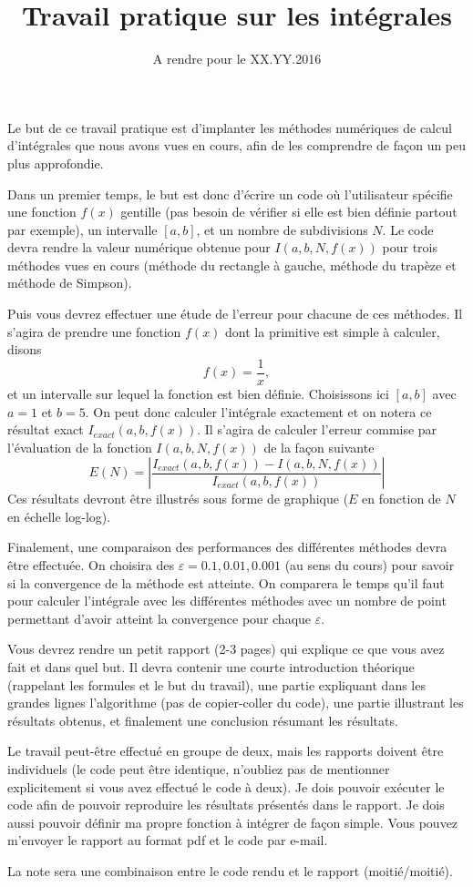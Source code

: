 \documentclass[a4paper,10pt]{article}
\title{Travail pratique sur les intégrales}
\date{A rendre pour le XX.YY.2016}
\begin{document}
\maketitle

Le but de ce travail pratique est d'implanter les méthodes numériques de calcul d'intégrales que nous avons vues en cours,
afin de les comprendre de façon un peu plus approfondie.

Dans un premier temps, le but est donc d'écrire un code où l'utilisateur spécifie une fonction $f(x)$ gentille (pas besoin de vérifier 
si elle est bien définie partout par exemple), un intervalle $[a,b]$, et 
un nombre de subdivisions $N$. Le code devra rendre la valeur numérique obtenue pour $I(a,b,N,f(x))$ pour trois méthodes 
vues en cours (méthode du rectangle à gauche, méthode du trapèze et méthode de Simpson).

Puis vous devrez effectuer une étude de l'erreur pour chacune de ces méthodes. Il s'agira de prendre une fonction $f(x)$ 
dont la primitive est simple à calculer, disons
\begin{equation}
f(x)=\frac{1}{x},
\end{equation}
et un intervalle sur lequel la fonction est bien définie. Choisissons ici $[a,b]$ avec $a=1$ et $b=5$. 
On peut donc calculer l'intégrale exactement et on notera ce résultat exact $I_{exact}(a,b,f(x))$.
Il s'agira de calculer l'erreur commise par l'évaluation de la fonction $I(a,b,N,f(x))$ de la façon suivante
\begin{equation}
 E(N)=\left|\frac{I_{exact}(a,b,f(x))-I(a,b,N,f(x))}{I_{exact}(a,b,f(x))}\right|
\end{equation}
Ces résultats devront être illustrés sous forme de graphique ($E$ en fonction de $N$ en échelle log-log).

Finalement, une comparaison des performances des différentes méthodes devra être effectuée.
On choisira des $\varepsilon=0.1,0.01,0.001$ (au sens du cours) pour savoir si la convergence de la méthode est atteinte.
On comparera le temps qu'il faut pour calculer l'intégrale avec les différentes méthodes
avec un nombre de point permettant d'avoir atteint la convergence pour chaque $\varepsilon$.

Vous devrez rendre un petit rapport (2-3 pages) qui explique ce que vous avez fait et dans quel but. Il devra contenir
une courte introduction théorique (rappelant les formules et le but du travail), une partie expliquant dans les grandes lignes 
l'algorithme (pas de copier-coller du code), une partie illustrant les résultats obtenus, et finalement
une conclusion résumant les résultats.

Le travail peut-être effectué en groupe de deux, mais les rapports doivent être individuels (le code peut être identique, n'oubliez pas de mentionner 
explicitement si vous avez effectué le code à deux).  Je dois pouvoir exécuter le code
afin de pouvoir reproduire les résultats présentés dans le rapport. Je dois aussi pouvoir définir ma propre fonction à intégrer de façon simple.
Vous pouvez m'envoyer le rapport au format pdf et le code par e-mail.

La note sera une combinaison entre le code rendu et le rapport (moitié/moitié). 
\end{document}

